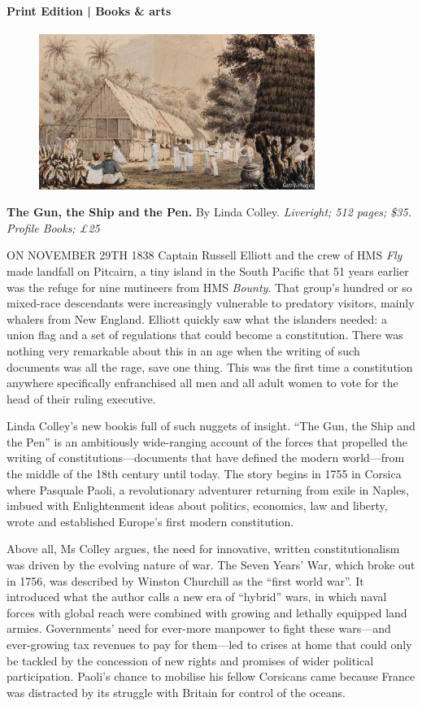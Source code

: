 \documentclass{article}
\begin{document}
\paragraph{Print Edition | Books \& arts  \quad \color{gray}{Mar 27th 2021 }}
\begin{figure}[h]
\centering
\includegraphics[width=0.8\textwidth]{images/20210327_BKP003_0.jpg}
\end{figure}
\textbf{The Gun, the Ship and the Pen.} By Linda Colley. \emph{Liveright; 512 pages; \$35. Profile Books; £25} 

\lettrine{O}N NOVEMBER 29TH 1838 Captain Russell Elliott and the crew of HMS \emph{Fly} made landfall on Pitcairn, a tiny island in the South Pacific that 51 years earlier was the refuge for nine mutineers from HMS \emph{Bounty}. That group's hundred or so mixed-race descendants were increasingly vulnerable to predatory visitors, mainly whalers from New England. Elliott quickly saw what the islanders needed: a union flag and a set of regulations that could become a constitution. There was nothing very remarkable about this in an age when the writing of such documents was all the rage, save one thing. This was the first time a constitution anywhere specifically enfranchised all men and all adult women to vote for the head of their ruling executive. 

Linda Colley's new bookis full of such nuggets of insight. ``The Gun, the Ship and the Pen'' is an ambitiously wide-ranging account of the forces that propelled the writing of constitutions---documents that have defined the modern world---from the middle of the 18th century until today. The story begins in 1755 in Corsica where Pasquale Paoli, a revolutionary adventurer returning from exile in Naples, imbued with Enlightenment ideas about politics, economics, law and liberty, wrote and established Europe's first modern constitution. 

Above all, Ms Colley argues, the need for innovative, written constitutionalism was driven by the evolving nature of war. The Seven Years' War, which broke out in 1756, was described by Winston Churchill as the ``first world war''. It introduced what the author calls a new era of ``hybrid'' wars, in which naval forces with global reach were combined with growing and lethally equipped land armies. Governments' need for ever-more manpower to fight these wars---and ever-growing tax revenues to pay for them---led to crises at home that could only be tackled by the concession of new rights and promises of wider political participation. Paoli's chance to mobilise his fellow Corsicans came because France was distracted by its struggle with Britain for control of the oceans. 
\end{document}
